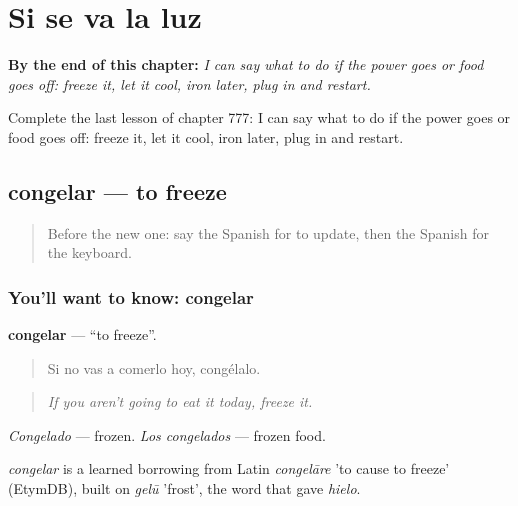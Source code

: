 
\chapter{Si se va la luz}
\label{ch:es-si-se-va-la-luz}

\begin{chapteropening}
\textbf{By the end of this chapter:} \emph{I can say what to do if the power goes or food goes off: freeze it, let it cool, iron later, plug in and restart.}

Complete the last lesson of chapter 777: I can say what to do if the power goes or food goes off: freeze it, let it cool, iron later, plug in and restart.
\end{chapteropening}

\section[congelar]{congelar — to freeze}

\label{lesson:ES-C777-congelar}



\begin{quote}
Before the new one: say the Spanish for to update, then the Spanish for the keyboard.
\end{quote}

\subsection*{You'll want to know: congelar}
\textbf{congelar} — \textquotedblleft{}to freeze\textquotedblright{}.

\begin{quote}
Si no vas a comerlo hoy, congélalo.
\end{quote}

\begin{quote}
\emph{If you aren't going to eat it today, freeze it.}
\end{quote}

\emph{Congelado} — frozen. \emph{Los congelados} — frozen food.

\begin{cousinweb}
\emph{congelar} is a learned borrowing from Latin \emph{congelāre} 'to cause to freeze' (EtymDB), built on \emph{gelū} 'frost', the word that gave \emph{hielo}.
\end{cousinweb}

